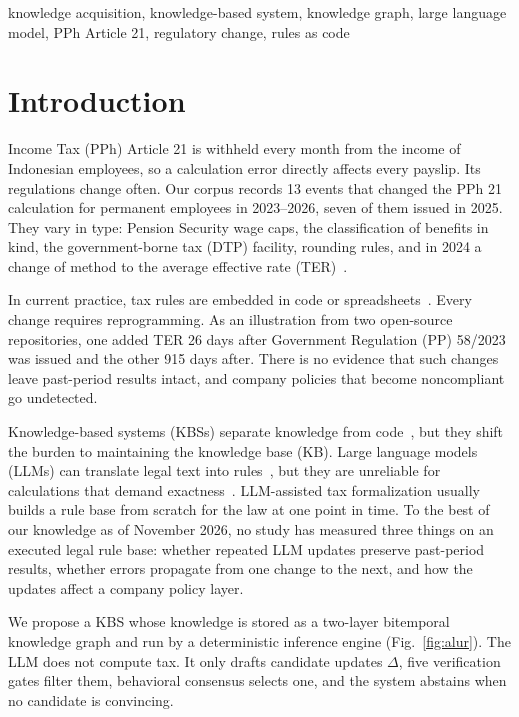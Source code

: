 \documentclass[conference]{IEEEtran}
\begin{document}
\begin{IEEEkeywords}
knowledge acquisition, knowledge-based system, knowledge graph, large language model, PPh Article 21, regulatory change, rules as code
\end{IEEEkeywords}

\section{Introduction}
\label{sec:pendahuluan}
Income Tax (PPh) Article 21 is withheld every month from the income of Indonesian employees, so a calculation error directly affects every payslip. Its regulations change often. Our corpus records 13 events that changed the PPh 21 calculation for permanent employees in 2023--2026, seven of them issued in 2025. They vary in type: Pension Security wage caps, the classification of benefits in kind, the government-borne tax (DTP) facility, rounding rules, and in 2024 a change of method to the average effective rate (TER)~\cite{pp58_2023,pmk168_2023}.

In current practice, tax rules are embedded in code or spreadsheets~\cite{ramadhani2021grossup,kusuma2026pph21}. Every change requires reprogramming. As an illustration from two open-source repositories, one added TER 26 days after Government Regulation (PP) 58/2023 was issued and the other 915 days after. There is no evidence that such changes leave past-period results intact, and company policies that become noncompliant go undetected.

Knowledge-based systems (KBSs) separate knowledge from code~\cite{merigoux2021catala}, but they shift the burden to maintaining the knowledge base (KB). Large language models (LLMs) can translate legal text into rules~\cite{janatian2023texttostructure}, but they are unreliable for calculations that demand exactness~\cite{nay2024taxattorneys,dahl2024legalfictions}. LLM-assisted tax formalization usually builds a rule base from scratch for the law at one point in time. To the best of our knowledge as of November 2026, no study has measured three things on an executed legal rule base: whether repeated LLM updates preserve past-period results, whether errors propagate from one change to the next, and how the updates affect a company policy layer.

We propose a KBS whose knowledge is stored as a two-layer bitemporal knowledge graph and run by a deterministic inference engine (Fig.~\ref{fig:alur}). The LLM does not compute tax. It only drafts candidate updates $\Delta$, five verification gates filter them, behavioral consensus selects one, and the system abstains when no candidate is convincing.
\end{document}
